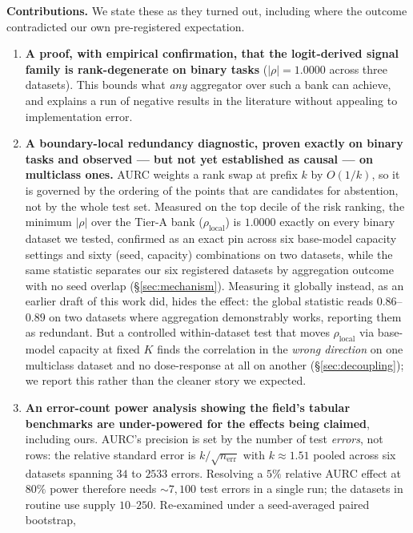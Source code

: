 \documentclass[conference]{IEEEtran}
\begin{document}
\textbf{Contributions.} We state these as they turned out, including where
the outcome contradicted our own pre-registered expectation.
\begin{enumerate}
  \item \textbf{A proof, with empirical confirmation, that the
    logit-derived signal family is rank-degenerate on binary tasks}
    ($|\rho| = 1.0000$ across three datasets). This bounds what
    \emph{any} aggregator over such a bank can achieve, and explains a
    run of negative results in the literature without appealing to
    implementation error.
  \item \textbf{A boundary-local redundancy diagnostic, proven exactly on
    binary tasks and observed --- but not yet established as causal ---
    on multiclass ones.} AURC weights a rank swap at prefix $k$ by
    $O(1/k)$, so it is governed by the ordering of the points that are
    candidates for abstention, not by the whole test set. Measured on the
    top decile of the risk ranking, the minimum $|\rho|$ over the Tier-A
    bank ($\rho_{\mathrm{local}}$) is $1.0000$ exactly on every binary
    dataset we tested, confirmed as an exact pin across six base-model
    capacity settings and sixty (seed, capacity) combinations on two
    datasets, while the same statistic separates our six registered
    datasets by aggregation outcome with no seed overlap
    (\S\ref{sec:mechanism}). Measuring it globally instead, as an earlier
    draft of this work did, hides the effect: the global statistic reads
    $0.86$--$0.89$ on two datasets where aggregation demonstrably works,
    reporting them as redundant. But a controlled within-dataset test
    that moves $\rho_{\mathrm{local}}$ via base-model capacity at fixed
    $K$ finds the correlation in the \emph{wrong direction} on one
    multiclass dataset and no dose-response at all on another
    (\S\ref{sec:decoupling}); we report this rather than the cleaner
    story we expected.
  \item \textbf{An error-count power analysis showing the field's
    tabular benchmarks are under-powered for the effects being claimed},
    including ours. AURC's precision is set by the number of test
    \emph{errors}, not rows: the relative standard error is
    $k/\sqrt{n_{\mathrm{err}}}$ with $k \approx 1.51$ pooled across six
    datasets spanning $34$ to $2533$ errors. Resolving a $5\%$ relative
    AURC effect at $80\%$ power therefore needs ${\sim}7{,}100$ test
    errors in a single run; the datasets in routine use supply
    $10$--$250$. Re-examined under a seed-averaged paired bootstrap,

\end{enumerate}
\end{document}
